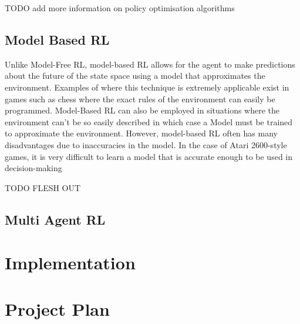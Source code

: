 \documentclass{article}
\begin{document}
TODO add more information on policy optimisation algorithms



\subsection{Model Based RL}

Unlike Model-Free RL, model-based RL allows for the agent to make predictions about the future of the state space using a model that approximates the environment\cite{Huang2020Model-basedLearning}. Examples of where this technique is extremely applicable exist in games such as chess where the exact rules of the environment can easily be programmed. Model-Based RL can also be employed in situations where the environment can't be so easily described in which case a Model must be trained to approximate the environment. However, model-based RL often has many disadvantages due to inaccuracies in the model. In the case of Atari 2600-style games, it is very difficult to learn a model that is accurate enough to be used in decision-making \cite{JannerWhenOptimization}

TODO FLESH OUT

\subsection{Multi Agent RL}







\section{Implementation}


\section{Project Plan}
\end{document}

